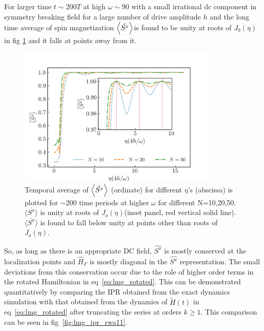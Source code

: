 \documentclass[%
reprint,
superscriptaddress,
amsmath,amssymb,
aps,
prb,
showkeys,
]{revtex4-2}
\begin{document}
	For larger time $t\sim 200 T$ at high $\omega \sim 90$ with a small irrational dc component in symmetry breaking field for a large number of drive amplitude $h$ and the long time average of spin magnetization $\expval{\hat{S^x}}$is found to be unity at roots of $J_0(\eta)$ in fig \ref{fig:sx_conserve} and it falls at points away from it. 
	\begin{figure}[t!]
		\centering
		\includegraphics[width =9.5cm]{sx_conservation.jpeg }
		\caption{Temporal average of $\expval{\hat{S^x}}$ (ordinate) for different $\eta$'s (abscissa) is plotted for $\sim 200$ time periods at higher $\omega$ for different N=10,20,50. $\overline{\langle S^x \rangle}$ is unity at roots of $J_o(\eta)$(inset panel, red vertical solid line). $\overline{\langle S^x \rangle}$ is found to fall below unity at points other than roots of $J_o(\eta)$.}
		\label{fig:sx_conserve}
	\end{figure}
	So, as long as there is an appropriate DC field, $\hat{S^x}$ is mostly conserved at the localization points and $\hat{H}_F$ is mostly diagonal in the $\hat{S^x}$ representation. The small deviations from this conservation occur due to the role of  higher order terms in the rotated Hamiltonian in eq~\ref{eq:lmg_rotated}. This can be demonstrated quantitatively by comparing the IPR obtained from the exact dynamics simulation with that obtained from the dynamics of $\tilde{H}(t)$ in eq~\ref{eq:lmg_rotated} after truncating the series at orders $k\geq 1$. This comparison can be seen in fig~\ref{fig:lmg_ipr_rwa11}.
\end{document}
